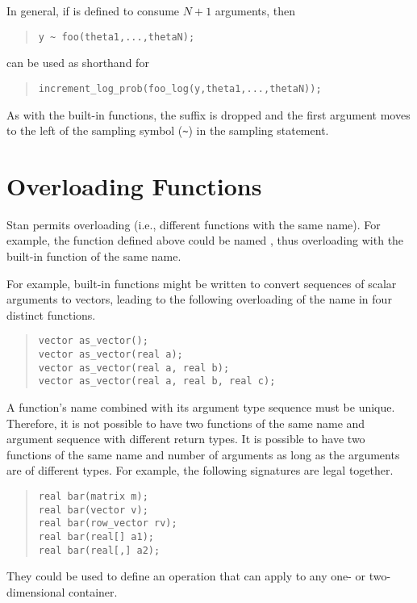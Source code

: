 In general, if  is defined to consume $N + 1$ arguments,
then
%
\begin{quote}
\begin{Verbatim}
y ~ foo(theta1,...,thetaN);
\end{Verbatim}
\end{quote}
%
can be used as shorthand for 
%
\begin{quote}
\begin{Verbatim}
increment_log_prob(foo_log(y,theta1,...,thetaN));
\end{Verbatim}
\end{quote}
%
As with the built-in functions, the suffix  is dropped and
the first argument moves to the left of the sampling symbol (\Verb|~|)
in the sampling statement.


\section{Overloading Functions}

Stan permits overloading (i.e., different functions with the same
name).  For example, the function  defined above
could be named , thus overloading with the built-in
function of the same name.

For example, built-in functions might be written to convert sequences
of scalar arguments to vectors, leading to the following overloading
of the name  in four distinct functions.
%
\begin{quote}
\begin{Verbatim}
vector as_vector();
vector as_vector(real a);
vector as_vector(real a, real b);
vector as_vector(real a, real b, real c);
\end{Verbatim}
\end{quote}

A function's name combined with its argument type sequence must be
unique.  Therefore, it is not possible to have two functions of the
same name and argument sequence with different return types.  It is
possible to have two functions of the same name and number of
arguments as long as the arguments are of different types.  For
example, the following signatures are legal together.
%
\begin{quote}
\begin{Verbatim}
real bar(matrix m);
real bar(vector v);
real bar(row_vector rv);
real bar(real[] a1);
real bar(real[,] a2);
\end{Verbatim}
\end{quote}
%
They could be used to define an operation that can apply to any one-
or two-dimensional container.

